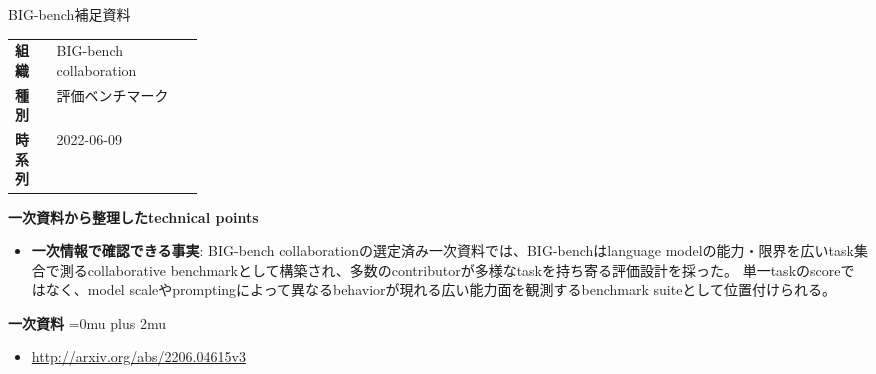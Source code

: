 \begin{technicalnote}{BIG-bench}{補足資料}
\begingroup
\begin{tabularx}{\linewidth}{@{}>{\bfseries}p{0.22\linewidth}X@{}}
組織 & BIG-bench collaboration \\
種別 & 評価ベンチマーク \\
時系列 & 2022-06-09 \\
\end{tabularx}
\smallskip
{\bfseries 一次資料から整理したtechnical points}
\begin{itemize}[leftmargin=1.5em,itemsep=0.35em]
\item \textbf{一次情報で確認できる事実}: BIG-bench collaborationの選定済み一次資料では、BIG-benchはlanguage modelの能力・限界を広いtask集合で測るcollaborative benchmarkとして構築され、多数のcontributorが多様なtaskを持ち寄る評価設計を採った。 単一taskのscoreではなく、model scaleやpromptingによって異なるbehaviorが現れる広い能力面を観測するbenchmark suiteとして位置付けられる。
\end{itemize}
\begin{minipage}{\linewidth}
\begin{samepage}
{\bfseries 一次資料}
\begingroup\sloppy
\Urlmuskip=0mu plus 2mu\relax
\begin{itemize}[leftmargin=1.5em,itemsep=0.25em]
\item {\scriptsize\url{http://arxiv.org/abs/2206.04615v3}}
\end{itemize}
\endgroup
\end{samepage}
\end{minipage}
\endgroup
\end{technicalnote}
\medskip
